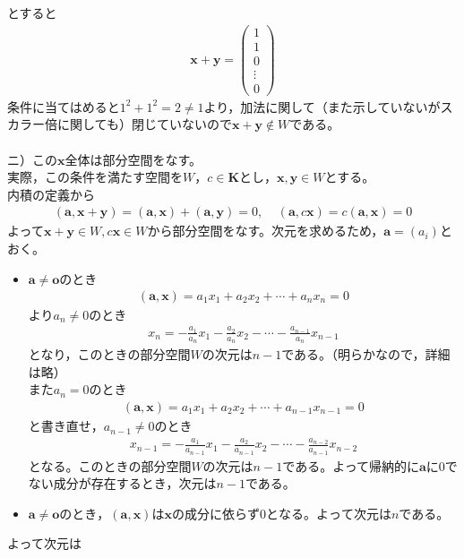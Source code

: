 \documentclass[dvipdfmx,uplatex,11pt]{jsarticle}
\begin{document}
とすると
\begin{eqnarray*}
\bm{x}+\bm{y}=
\begin{pmatrix}
1 \\
1 \\
0 \\
\vdots \\
0
\end{pmatrix}
\end{eqnarray*}
条件に当てはめると$1^2+1^2=2 \neq 1$より，加法に関して（また示していないがスカラー倍に関しても）閉じていないので$\bm{x}+\bm{y} \not\in W$である。\\
\dotfill \\
ニ）この$\bm{x}全体$は部分空間をなす。$実際，この条件を満たす空間をW，c \in \bm{K}とし，\bm{x,y} \in W$とする。\\
内積の定義から
\begin{eqnarray*}
(\bm{a},\bm{x}+\bm{y})=(\bm{a},\bm{x})+(\bm{a},\bm{y})=0 ,~~~~~(\bm{a},c\bm{x})=c(\bm{a},\bm{x})=0
\end{eqnarray*}
よって$\bm{x}+\bm{y} \in W, c\bm{x} \in W$から部分空間をなす。次元を求めるため，$\bm{a}=(a_{i})$とおく。
\begin{itemize}
\item $\bm{a} \neq \bm{o}のとき$
\begin{eqnarray*}
(\bm{a},\bm{x})=a_1x_1+a_2x_2+ \cdots +a_nx_n=0
\end{eqnarray*}
より$a_n \neq 0$のとき
\begin{eqnarray*}
x_n=-\frac{a_1}{a_n}x_{1}-\frac{a_2}{a_n}x_{2}- \cdots -\frac{a_{n-1}}{a_n}x_{n-1}
\end{eqnarray*}
となり，このときの部分空間$Wの次元はn-1$である。（明らかなので，詳細は略）\\
また$a_n=0$のとき
\begin{eqnarray*}
(\bm{a},\bm{x})=a_1x_1+a_2x_2+ \cdots +a_{n-1}x_{n-1}=0
\end{eqnarray*}
と書き直せ，$a_{n-1} \neq 0$のとき
\begin{eqnarray*}
x_{n-1}=-\frac{a_1}{a_{n-1}}x_{1}-\frac{a_2}{a_{n-1}}x_{2}- \cdots -\frac{a_{n-2}}{a_{n-1}}x_{n-2}
\end{eqnarray*}
となる。このときの部分空間$Wの次元はn-1である。$よって帰納的に$\bm{a}$に0でない成分が存在するとき，次元は$n-1$である。\\
\item $\bm{a} \neq \bm{o}のとき，(\bm{a},\bm{x})は\bm{x}の成分に依らず0となる。よって次元はnである。$
\end{itemize}
よって次元は
\end{document}
